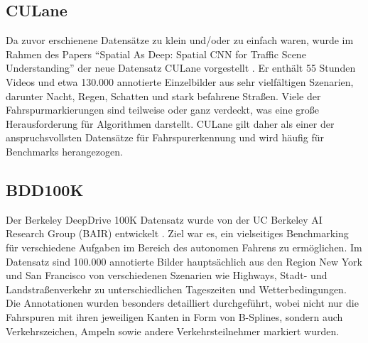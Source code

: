     \subsection{CULane}
    Da zuvor erschienene Datensätze zu klein und/oder zu einfach waren, wurde im Rahmen des Papers \enquote{Spatial As Deep: Spatial CNN for Traffic Scene Understanding} der neue Datensatz CULane vorgestellt \cite{CULanePaper}.
    Er enthält 55 Stunden Videos und etwa 130.000 annotierte Einzelbilder aus sehr vielfältigen Szenarien, darunter Nacht, Regen, Schatten und stark befahrene Stra{\ss}en.
    Viele der Fahrspurmarkierungen sind teilweise oder ganz verdeckt, was eine gro{\ss}e Herausforderung für Algorithmen darstellt.
    CULane gilt daher als einer der anspruchsvollsten Datensätze für Fahrspurerkennung und wird häufig für Benchmarks herangezogen.
    \subsection{BDD100K}
    \label{chapter_bdd100k}
    Der Berkeley DeepDrive 100K Datensatz wurde von der UC Berkeley AI Research Group (BAIR) entwickelt \cite{bdd100k}. 
    Ziel war es, ein vielseitiges Benchmarking für verschiedene Aufgaben im Bereich des autonomen Fahrens zu ermöglichen.
    Im Datensatz sind 100.000 annotierte Bilder hauptsächlich aus den Region New York und San Francisco von verschiedenen Szenarien wie Highways, Stadt- und Landstra{\ss}enverkehr zu unterschiedlichen Tageszeiten und Wetterbedingungen.
    Die Annotationen wurden besonders detailliert durchgeführt, wobei nicht nur die Fahrspuren mit ihren jeweiligen Kanten in Form von B-Splines, sondern auch Verkehrszeichen, Ampeln sowie andere Verkehrsteilnehmer markiert wurden.
